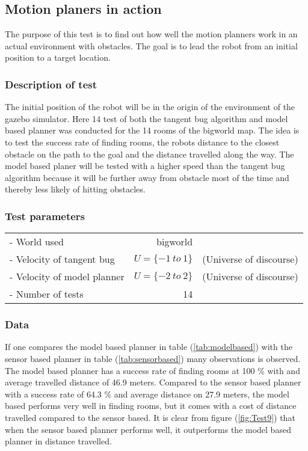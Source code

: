 \documentclass[../Head/Main.tex]{subfiles}
\begin{document}
\subsection{Motion planers in action}
\label{subsec:testMotionPlanning}

The purpose of this test is to find out how well the motion planners work in an actual environment with obstacles. The goal is to lead the robot from an initial position to a target location. 

\subsubsection*{Description of test}

The initial position of the robot will be in the origin of the environment of the gazebo simulator. Here 14 test of both the tangent bug algorithm and model based planner was conducted for the 14 rooms of the bigworld map. The idea is to test the success rate of finding rooms, the robots distance to the closest obstacle on the path to the goal and the distance travelled along the way. The model based planer will be tested with a higher speed than the tangent bug algorithm because it will be further away from obstacle most of the time and thereby less likely of hitting obstacles.           

\subsubsection*{Test parameters}

\begin{tabular}{l r l}
	- World used                    & bigworld & \\	
	- Velocity of tangent bug       & $U=\{-1~to~1\}$ & (Universe of discourse)\\
	- Velocity of model planner     & $U=\{-2~to~2\}$ & (Universe of discourse)\\
	- Number of tests               & 14 & 
\end{tabular}

\subsubsection*{Data}

If one compares the model based planner in table (\ref{tab:modelbased}) with the sensor based planner in table (\ref{tab:sensorbased}) many observations is observed. The model based planner has a success rate of finding rooms at 100 \% with and average travelled distance of 46.9 meters. Compared to the sensor based planner with a success rate of 64.3 \% and average distance on 27.9 meters, the model based performs very well in finding rooms, but it comes with a cost of distance travelled compared to the sensor based. It is clear from figure (\ref{fig:Test9}) that when the sensor based planner performs well, it outperforms the model based planner in distance travelled.    
\end{document}
